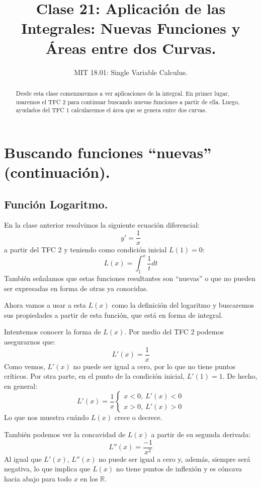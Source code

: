 \documentclass[12pt]{article}
\title{Clase 21: Aplicación de las Integrales: Nuevas Funciones y Áreas entre dos Curvas.}
\author{MIT 18.01: Single Variable Calculus.}
\date{}
\begin{document}
\maketitle

\begin{abstract}
\noindent Desde esta clase comenzaremos a ver aplicaciones de la integral. En primer lugar, usaremos el TFC 2 para continuar buscando nuevas funciones a partir de ella. Luego, ayudados del TFC 1 calcularemos el área que se genera entre dos curvas.
\end{abstract}

\section{Buscando funciones ``nuevas'' (continuación).}

\subsection{Función Logaritmo.}

En la clase anterior resolvimos la siguiente ecuación diferencial:
\[
  y' = \frac{1}{x}
\]
a partir del TFC 2 y teniendo como condición inicial $L(1) = 0$:
\[
  L(x) = \int_{1}^{x} \frac{1}{t}dt
\]
También señalamos que estas funciones resultantes son ``nuevas'' o que no pueden ser expresadas en forma de otras ya conocidas.

Ahora vamos a usar a esta $L(x)$ como la definición del logaritmo y buscaremos sus propiedades a partir de esta función, que está en forma de integral.

Intentemos conocer la forma de $L(x)$. Por medio del TFC 2 podemos asegurarnos que:
\[
  L'(x) = \frac{1}{x}
\]
Como vemos, $L'(x)$ no puede ser igual a cero, por lo que no tiene puntos críticos. Por otra parte, en el punto de la condición inicial, $L'(1) = 1$. De hecho, en general:
\[
  L'(x) = \frac{1}{x}
    \left\{
      \begin{aligned}
      x < 0, \ L'(x) < 0 \\
      x > 0, \ L'(x) > 0
      \end{aligned}
    \right.
\]
Lo que nos muestra cuándo $L(x)$ crece o decrece.

También podemos ver la concavidad de $L(x)$ a partir de su segunda derivada:
\[
  L''(x) = \frac{-1}{x^{2}}
\]
Al igual que $L'(x)$, $L''(x)$ no puede ser igual a cero y, además, siempre será negativa, lo que implica que $L(x)$ no tiene puntos de inflexión y es cóncava hacia abajo para todo $x$ en los $\mathbb{R}$.
\end{document}
